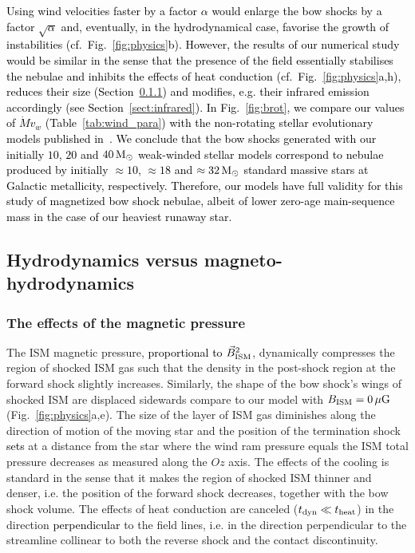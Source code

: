 \documentclass[useAMS,usenatbib]{mn2e}
\begin{document}
\textcolor{black}{
Using wind velocities faster by a factor $\alpha$ would 
enlarge the bow shocks by a factor $\sqrt{\alpha}$ and, eventually, in the 
hydrodynamical case, favorise the growth of \textcolor{black}{instabilities} (cf.~Fig.~\ref{fig:physics}b). 
However, the results of our numerical study would be similar in the sense 
that the presence of the field essentially stabilises the nebulae and inhibits 
the effects of heat conduction (cf.~Fig.~\ref{fig:physics}a,h), 
reduces their size (Section~\ref{sect:titi}) and modifies, e.g.  
their infrared emission accordingly (see Section~\ref{sect:infrared}). 
In Fig.~\ref{fig:brot}, we compare our values of $\dot{M} v_{w}$ 
(Table~\ref{tab:wind_para}) with the non-rotating stellar evolutionary models 
published in~\citet{brott_aa_530_2011a}. We conclude that the 
bow shocks generated with our initially $10$, $20$ and $40\, \rm M_{\odot}$ 
weak-winded stellar models correspond to nebulae produced by 
initially $\approx10$, $\approx18$ and $\approx32\, \rm M_{\odot}$ standard massive stars 
at Galactic metallicity, respectively. Therefore, our models have full validity 
for this study of magnetized bow shock nebulae, albeit of lower zero-age 
main-sequence mass in the case of our heaviest runaway star. 
}





\subsection{Hydrodynamics versus magneto-hydrodynamics}
\label{sect:physics3}


\subsubsection{The effects of the magnetic pressure}
\label{sect:titi}


The ISM magnetic pressure, \textcolor{black}{proportional to $\vec{B}_{\rm ISM}^{2}$}, 
dynamically compresses the region of shocked ISM gas such that the density in the
post-shock region at the forward shock slightly increases. Similarly, the shape
of the bow shock's wings of shocked ISM are displaced sidewards compare to our
model with $B_{\rm ISM}=0\, \mu \rm G$ (Fig.~\ref{fig:physics}a,e). The size
of the layer of ISM gas diminishes along the direction of motion of the moving star and the position of
the termination shock \textcolor{black}{sets} at a distance from the star where the wind ram
pressure equals the ISM total pressure decreases as measured along the $Oz$
axis. The effects of the cooling is standard in the sense that it makes the
region of shocked ISM thinner and denser, i.e. the position of the forward shock
decreases, together with the bow shock volume. The effects of heat conduction
are canceled ($t_{\rm dyn} \ll t_{\rm heat}$) in the direction \textcolor{black}{perpendicular} to the
field lines, i.e. in the direction perpendicular to the streamline collinear 
to both the reverse shock and the contact discontinuity.
\end{document}
